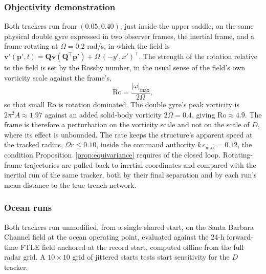 \documentclass[lettersize,journal]{IEEEtran}
\begin{document}
\subsubsection{Objectivity demonstration}
Both trackers run from $(0.05, 0.40)$, just inside the upper saddle, on
the same physical double gyre expressed in two
observer frames, the inertial frame, and a frame rotating at
$\Omega = 0.2$ rad/s, in which the field is
$\mathbf{v}'(\mathbf{p}', t) = \mathbf{Q}\mathbf{v}(\mathbf{Q}^\top
\mathbf{p}') + \Omega\,(-y', x')^\top$. The strength of the rotation
relative to the field is set by the Rossby number, in the usual sense of
the field's own vorticity scale against the frame's,
\begin{equation}
    \mathrm{Ro} = \frac{\lvert\omega\rvert_{\max}}{2\Omega} ,
\end{equation}
so that small $\mathrm{Ro}$ is rotation dominated. The double gyre's peak
vorticity is $2\pi^2 A \approx 1.97$ against an added solid-body
vorticity $2\Omega = 0.4$, giving $\mathrm{Ro} \approx 4.9$. The frame is
therefore a perturbation on the vorticity scale and not on the scale of
$D$, where its effect is unbounded. The rate keeps the
structure's apparent speed at the tracked radius, $\Omega r \leq 0.10$,
inside the command authority $k\,c_{\max} = 0.12$, the condition
Proposition~\ref{prop:equivariance} requires of the closed loop.
Rotating-frame
trajectories are pulled back to inertial coordinates and compared with
the inertial run of the same tracker, both by their final separation and
by each run's mean distance to the true trench network.

\subsubsection{Ocean runs}
Both trackers run unmodified, from a single shared start, on the Santa
Barbara Channel field at the ocean operating point, evaluated against the 24-h forward-time FTLE
field anchored at the record start, computed offline from the full
radar grid. A $10 \times 10$ grid
of jittered starts tests start sensitivity for the $D$ tracker.
\end{document}
